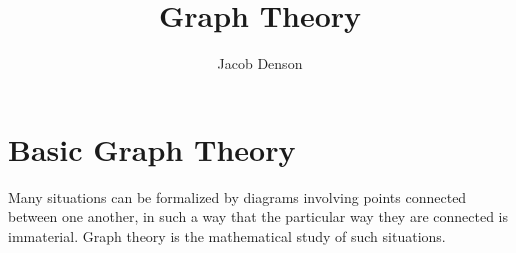 

\title{Graph Theory}
\author{Jacob Denson}




\maketitle

\tableofcontents


\chapter{Basic Graph Theory}

Many situations can be formalized by diagrams involving points connected between one another, in such a way that the particular way they are connected is immaterial. Graph theory is the mathematical study of such situations.

 